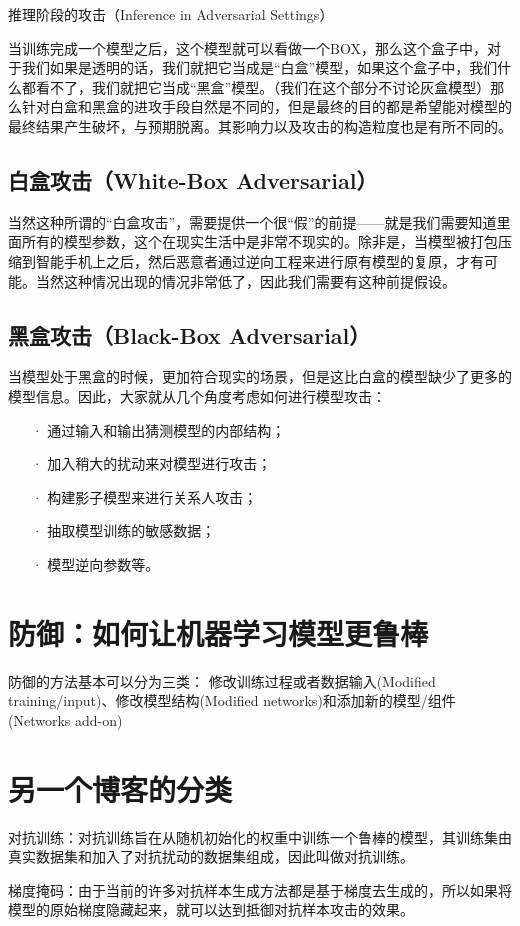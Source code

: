 \documentclass[UTF8]{ctexart}
\begin{document}
	推理阶段的攻击（Inference in Adversarial Settings）

	当训练完成一个模型之后，这个模型就可以看做一个BOX，那么这个盒子中，对于我们如果是透明的话，我们就把它当成是“白盒”模型，如果这个盒子中，我们什么都看不了，我们就把它当成“黑盒”模型。（我们在这个部分不讨论灰盒模型）那么针对白盒和黑盒的进攻手段自然是不同的，但是最终的目的都是希望能对模型的最终结果产生破坏，与预期脱离。其影响力以及攻击的构造粒度也是有所不同的。
	\subsection{白盒攻击（White-Box Adversarial）}
	当然这种所谓的“白盒攻击”，需要提供一个很“假”的前提——就是我们需要知道里面所有的模型参数，这个在现实生活中是非常不现实的。除非是，当模型被打包压缩到智能手机上之后，然后恶意者通过逆向工程来进行原有模型的复原，才有可能。当然这种情况出现的情况非常低了，因此我们需要有这种前提假设。
	\subsection{黑盒攻击（Black-Box Adversarial）}
	当模型处于黑盒的时候，更加符合现实的场景，但是这比白盒的模型缺少了更多的模型信息。因此，大家就从几个角度考虑如何进行模型攻击：
	\begin{itemize}
	\item[·] 通过输入和输出猜测模型的内部结构；
	\item[·] 加入稍大的扰动来对模型进行攻击；
	\item[·] 构建影子模型来进行关系人攻击；
	\item[·] 抽取模型训练的敏感数据；
	\item[·] 模型逆向参数等。
	\end{itemize}
	\clearpage

	\section{防御：如何让机器学习模型更鲁棒}\label{sec:disanjie}
	防御的方法基本可以分为三类： 修改训练过程或者数据输入(Modified training/input)、修改模型结构(Modified networks)和添加新的模型/组件(Networks add-on)
	\clearpage
	\section{另一个博客的分类}\label{sec:disijie}
	对抗训练：对抗训练旨在从随机初始化的权重中训练一个鲁棒的模型，其训练集由真实数据集和加入了对抗扰动的数据集组成，因此叫做对抗训练。

	梯度掩码：由于当前的许多对抗样本生成方法都是基于梯度去生成的，所以如果将模型的原始梯度隐藏起来，就可以达到抵御对抗样本攻击的效果。
\end{document}
